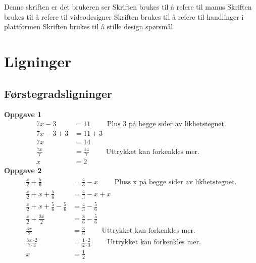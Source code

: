 \documentclass[12pt,twoside,onecolumn]{article}
\begin{document}
Denne skriften er det brukeren ser\newline
{\color{gray} Skriften brukes til å refere til manus} \newline
{\color{PineGreen} Skriften brukes til å refere til videodesigner} \newline
{\color{Maroon} Skriften brukes til å refere til handlinger i plattformen} \newline
{\color{Cerulean} Skriften brukes til å stille design spørsmål}
\section*{Ligninger}

\subsection*{Førstegradsligninger}

\textbf{Oppgave 1}
\begin{align}
7x - 3 &= 11  \qquad\text{ Plus 3 på begge sider av likhetstegnet.}\\
7x -3 +3 &= 11 + 3\\
7x &= 14\\  
\frac{7x}{7} &=  \frac{14}{7} \qquad\text{ Uttrykket kan forkenkles mer.}\\
x &= 2
\end{align}
\newline
\textbf{Oppgave 2}
\begin{align}
\frac{x}{2} + \frac{5}{6} &=  \frac{4}{3} - x \qquad\text{ Pluss x på begge sider av likhetstegnet.}\\
\frac{x}{2} + x + \frac{5}{6} &=  \frac{4}{3} - x + x\\
\frac{x}{2} + x + \frac{5}{6} - \frac{5}{6} &=  \frac{4}{3} - \frac{5}{6}\\
\frac{x}{2} + \frac{2x}{2} &= \frac{8}{6} - \frac{5}{6}\\
\frac{3x}{2}  &= \frac{3}{6} \qquad\text{ Uttrykket kan forkenkles mer.}\\ 
\frac{3x\cdot2}{7\cdot3} &=  \frac{1\cdot2}{2\cdot3} \qquad\text{ Uttrykket kan forkenkles mer.}\\
x &= \frac{1}{2}
\end{align}
\end{document}
